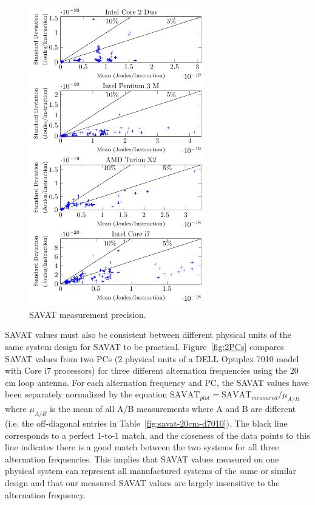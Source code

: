 \begin{figure}[htb]
  \centering
  \includegraphics[width=3in]{../TEMC_SAVAT/figures/variation.pdf}
  \caption{SAVAT measurement precision.}
  \label{fig:Variation}
\end{figure}

SAVAT values must also be consistent between different physical units of the same system design for SAVAT to be practical. Figure~\ref{fig:2PCs} compares SAVAT values from two PCs (2 physical units of a DELL Optiplex 7010 model with Core i7 processors) for three different alternation frequencies using the 20 cm loop antenna. For each alternation frequency and PC, the SAVAT values have been separately normalized by the equation $\textrm{SAVAT}_{plot} = \textrm{SAVAT}_{measured}/\mu_{A/B}$ %
where $\mu_{A/B}$ is the mean of all A/B measurements where A and B are different (i.e. the off-diagonal entries in Table~\ref{fig:savat-20cm-d7010}). The black line corresponds to a perfect 1-to-1 match, and the closeness of the data points to this line indicates there is a good match between the two systems for all three alternation frequencies. This implies that SAVAT values measured on one physical system can represent all manufactured systems of the same or similar design and that our measured SAVAT values are largely insensitive to the alternation frequency.

